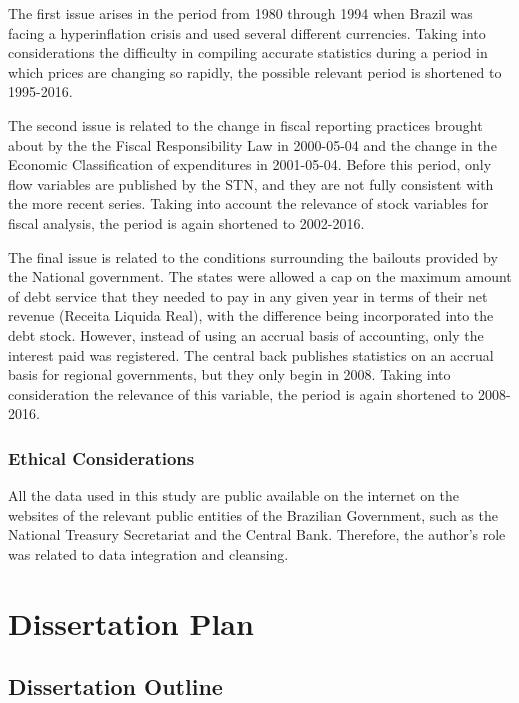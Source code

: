 \documentclass[12pt]{article}
\begin{document}
The first issue arises in the period from 1980 through 1994 when Brazil was facing a hyperinflation crisis and used several different currencies. Taking into considerations the difficulty in compiling accurate statistics during a period in which prices are changing so rapidly, the possible relevant period is shortened to 1995-2016. 

The second issue is related to the change in fiscal reporting practices brought about by the the Fiscal Responsibility Law in 2000-05-04 and the change in the Economic Classification of expenditures in 2001-05-04. Before this period, only flow variables are published by the STN, and they are not fully consistent with the more recent series. Taking into account the relevance of stock variables for fiscal analysis, the period is again shortened to 2002-2016.

The final issue is related to the conditions surrounding the bailouts provided by the National government. The states were allowed a cap on the maximum amount of debt service that they needed to pay in any given year in terms of their net revenue (Receita Liquida Real), with the difference being incorporated into the debt stock. However, instead of using an accrual basis of accounting, only the interest paid was registered. The central back publishes statistics on an accrual basis for regional governments, but they only begin in 2008. Taking into consideration the relevance of this variable, the period is again shortened to 2008-2016.

\subsubsection{Ethical Considerations}

All the data used in this study are public available on the internet on the websites of the relevant public entities of the Brazilian Government, such as the National Treasury Secretariat and the Central Bank. Therefore, the author's role was related to data integration and cleansing.

\newpage
\section{Dissertation Plan}

\subsection{Dissertation Outline}
\end{document}
